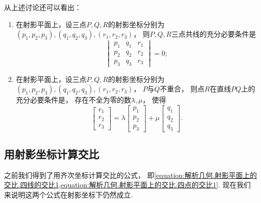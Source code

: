 从上述讨论还可以看出：\begin{enumerate}
	\item 在射影平面上，设三点\(P,Q,R\)的射影坐标分别为\(
		(p_1,p_2,p_3),
		(q_1,q_2,q_3),
		(r_1,r_2,r_3)
	\)，
	则\(P,Q,R\)三点共线的充分必要条件是\begin{equation*}
		\begin{vmatrix}
			p_1 & q_1 & r_1 \\
			p_2 & q_2 & r_2 \\
			p_3 & q_3 & r_3
		\end{vmatrix}
		= 0;
	\end{equation*}

	\item 在射影平面上，设三点\(P,Q,R\)的射影坐标分别为\(
		(p_1,p_2,p_3),
		(q_1,q_2,q_3),
		(r_1,r_2,r_3)
	\)，
	\(P\)与\(Q\)不重合，
	则点\(R\)在直线\(PQ\)上的充分必要条件是，
	存在不全为零的数\(\lambda,\mu\)，
	使得\begin{equation*}
		\begin{bmatrix}
			r_1 \\ r_2 \\ r_3
		\end{bmatrix}
		= \lambda \begin{bmatrix}
			p_1 \\ p_2 \\ p_3
		\end{bmatrix}
		+ \mu \begin{bmatrix}
			q_1 \\ q_2 \\ q_3
		\end{bmatrix}.
	\end{equation*}
\end{enumerate}

\subsection{用射影坐标计算交比}
之前我们得到了用齐次坐标计算交比的公式，
即\cref{equation:解析几何.射影平面上的交比.四线的交比1,equation:解析几何.射影平面上的交比.四点的交比1}.
现在我们来说明这两个公式在射影坐标下仍然成立.

